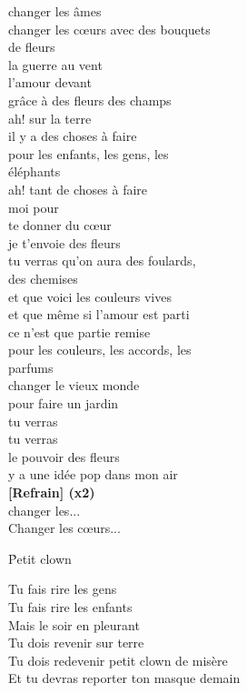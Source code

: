 \documentclass{novel}
\begin{document}
\begin{multicols}{2}
changer les âmes \\
changer les cœurs avec des bouquets \\
de fleurs \\
la guerre au vent \\
l'amour devant \\
grâce à des fleurs des champs \\

ah! sur la terre \\
il y a des choses à faire \\
pour les enfants, les gens, les \\
éléphants \\
ah! tant de choses à faire \\
moi pour \\
te donner du cœur \\
je t'envoie des fleurs \\

tu verras qu'on aura des foulards, \\
des chemises \\
et que voici les couleurs vives \\
et que même si l'amour est parti \\
ce n'est que partie remise \\
pour les couleurs, les accords, les \\
parfums \\
changer le vieux monde \\
pour faire un jardin \\
tu verras \\
tu verras \\
le pouvoir des fleurs \\
y a une idée pop dans mon air \\

\textbf{[Refrain] (x2)} \\

changer les... \\
Changer les cœurs... \\
\end{multicols}

\newpage
\normalsize

\h*{Petit clown}

Tu fais rire les gens \\
Tu fais rire les enfants \\
Mais le soir en pleurant \\
Tu dois revenir sur terre \\
Tu dois redevenir petit clown de misère \\
Et tu devras reporter ton masque demain \\
\end{document}
